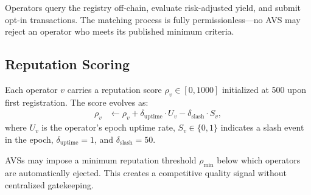 Operators query the registry off-chain, evaluate risk-adjusted yield, and submit opt-in
transactions. The matching process is fully permissionless---no AVS may reject an operator
who meets its published minimum criteria.

\subsection{Reputation Scoring}

Each operator $v$ carries a reputation score $\rho_v \in [0, 1000]$ initialized at 500
upon first registration. The score evolves as:
\begin{align}
  \rho_v &\leftarrow \rho_v + \delta_{\text{uptime}} \cdot U_v - \delta_{\text{slash}} \cdot S_v,
\end{align}
where $U_v$ is the operator's epoch uptime rate, $S_v \in \{0,1\}$ indicates a slash event
in the epoch, $\delta_{\text{uptime}} = 1$, and $\delta_{\text{slash}} = 50$.

AVSs may impose a minimum reputation threshold $\rho_{\min}$ below which operators are
automatically ejected. This creates a competitive quality signal without centralized
gatekeeping.

